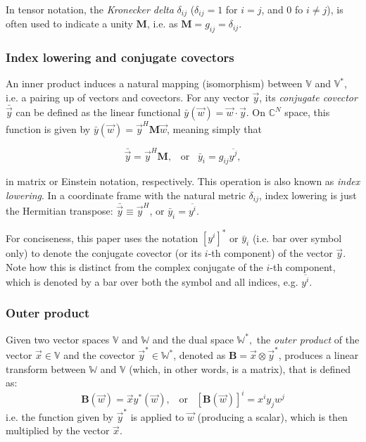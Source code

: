 \documentclass[]{aa}
\newcommand{\herm}{H}
\begin{document}
In tensor notation, the \emph{Kronecker delta} $\delta_{ij}$ ($\delta_{ij}=1$ for $i=j$, and 0 fo $i\ne j$), is often used to indicate a unity $\mathbf{M}$, i.e. as $\mathbf{M}=g_{ij}=\delta_{ij}.$

 
\subsubsection{Index lowering and conjugate covectors}
\label{sec:index-lowering}

An inner product induces a natural mapping (isomorphism) between $\mathbb{V}$ and $\mathbb{V}^*$, i.e. a pairing up of vectors and covectors.
For any vector $\vec y$, its \emph{conjugate covector} $\bar{\vec y}$ can be defined as the linear functional $\bar y(\vec w) = \vec w \cdot \vec y.$ On $\mathbb{C}^N$ space, this function is given by $\bar y(\vec w) = \vec y^\herm \mathbf{M} \vec w$, meaning simply that

\[
\bar{\vec y} = \vec y^H \mathbf{M},\;\;\;\mbox{or}\;\;\;\bar y_i=g_{ij} \overline{y^j},
\]

in matrix or Einstein notation, respectively. This operation is also known as \emph{index lowering}.
In a coordinate frame with the natural metric $\delta_{ij}$, index lowering is just the Hermitian transpose: $\bar{\vec y}\equiv\vec y^H$, or $\bar y_i=\overline{y^i}.$

For conciseness, this paper uses the notation $[y^i]^*$ or $\bar y_i$ (i.e. bar over symbol only) to denote the conjugate covector (or its $i$-th component) of the vector $\vec y$. Note how this is distinct from the complex conjugate of the $i$-th component, which is denoted by a bar over both the symbol and all indices, e.g. $\overline{y^i}.$

\subsubsection{Outer product}
\label{sec:outer-prod}

Given two vector spaces $\mathbb{V}$ and $\mathbb{W}$ and the dual space $\mathbb{W}^*,$ the \emph{outer product} of the vector 
$\vec x \in \mathbb{V}$ and the covector $\vec y^* \in \mathbb{W}^*$, denoted as $\mathbf{B}=\vec x\otimes\vec y^*$,  produces a linear transform between $\mathbb{W}$ and $\mathbb{V}$ (which, in other words, is a matrix), that is defined as:
\[
\mathbf{B}(\vec w) = \vec x y^*(\vec w),\;\;\;\mbox{or}\;\;\;[\mathbf{B}(\vec w)]^i = x^iy_jw^j
\]
i.e. the function given by $\vec y^*$ is applied to $\vec w$ (producing a scalar), which is then multiplied by the vector $\vec x$. 
\end{document}

